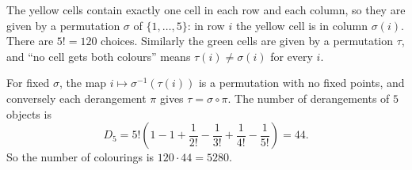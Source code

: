 The yellow cells contain exactly one cell in each row and each column, so they are given by a permutation $\sigma$ of $\{1,\dots,5\}$: in row $i$ the yellow cell is in column $\sigma(i)$. There are $5!=120$ choices. Similarly the green cells are given by a permutation $\tau$, and ``no cell gets both colours'' means $\tau(i)\ne\sigma(i)$ for every $i$.

For fixed $\sigma$, the map $i\mapsto\sigma^{-1}(\tau(i))$ is a permutation with no fixed points, and conversely each derangement $\pi$ gives $\tau=\sigma\circ\pi$. The number of derangements of $5$ objects is
\[
D_5=5!\left(1-1+\dfrac{1}{2!}-\dfrac{1}{3!}+\dfrac{1}{4!}-\dfrac{1}{5!}\right)=44 .
\]
So the number of colourings is $120\cdot44=\boxed{5280}$.
